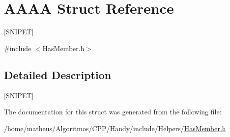 \hypertarget{structAAAA}{}\section{A\+A\+AA Struct Reference}
\label{structAAAA}


\mbox{[}S\+N\+I\+P\+ET\mbox{]}  




{\ttfamily \#include $<$Has\+Member.\+h$>$}



\subsection{Detailed Description}
\mbox{[}S\+N\+I\+P\+ET\mbox{]} 

The documentation for this struct was generated from the following file\+:\begin{DoxyCompactItemize}
\item 
/home/matheus/\+Algoritmos/\+C\+P\+P/\+Handy/include/\+Helpers/\hyperlink{HasMember_8h}{Has\+Member.\+h}\end{DoxyCompactItemize}
